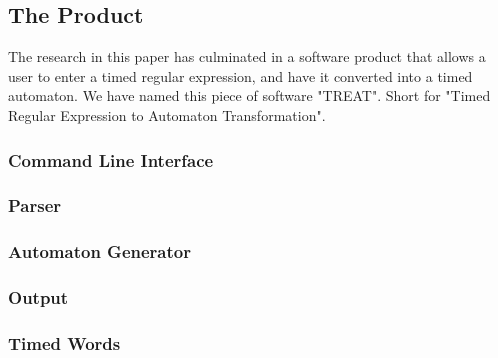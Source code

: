\subsection{The Product}\label{subsec:theProduct}
The research in this paper has culminated in a software product that allows a user to enter a timed regular expression, and have it converted into a timed automaton.
We have named this piece of software "TREAT". Short for "Timed Regular Expression to Automaton Transformation".

\subsubsection{Command Line Interface}

\subsubsection{Parser}

\subsubsection{Automaton Generator}

\subsubsection{Output}

\subsubsection{Timed Words}
